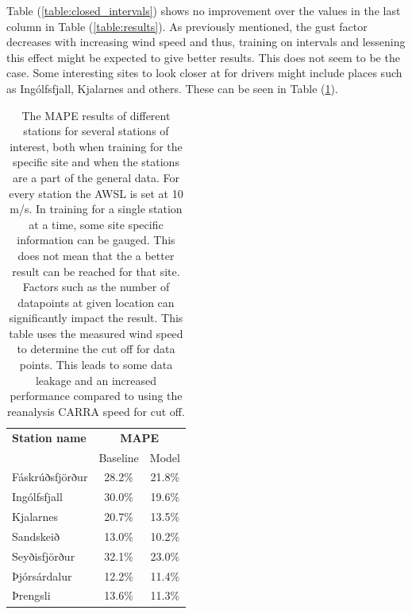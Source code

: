 Table (\ref{table:closed_intervals}) shows no improvement over the values in the last column in Table (\ref{table:results}). As previously mentioned, the gust factor decreases with increasing wind speed and thus, training on intervals and lessening this effect might be expected to give better results. This does not seem to be the case. Some interesting sites to look closer at for drivers might include places such as Ingólfsfjall, Kjalarnes and others. These can be seen in Table (\ref{table:more_specific_sites}).

\begin{table}[h]
    \caption[Model result by stations of interest]{The MAPE results of different stations for several stations of interest, both when training for the specific site and when the stations are a part of the general data. For every station the AWSL is set at 10 m/s. In training for a single station at a time, some site specific information can be gauged. This does not mean that the a better result can be reached for that site. Factors such as the number of datapoints at given location can significantly impact the result. This table uses the measured wind speed to determine the cut off for data points. This leads to some data leakage and an increased performance compared to using the reanalysis CARRA speed for cut off.}
    \label{table:more_specific_sites}
    \centering
    \begin{tabular}{lcc}
        \toprule
        \textbf{Station name} & \multicolumn{2}{c}{\textbf{MAPE}}\\
         & Baseline & Model\\
        \midrule
        Fáskrúðsfjörður & 28.2\% & 21.8\%\\
        Ingólfsfjall & 30.0\% & 19.6\%\\
        Kjalarnes & 20.7\% & 13.5\% \\
        Sandskeið & 13.0\% & 10.2\%\\
        Seyðisfjörður & 32.1\% & 23.0\%\\
        Þjórsárdalur & 12.2\% & 11.4\%\\
        Þrengsli & 13.6\% & 11.3\%\\
        \bottomrule
    \end{tabular}
\end{table}

